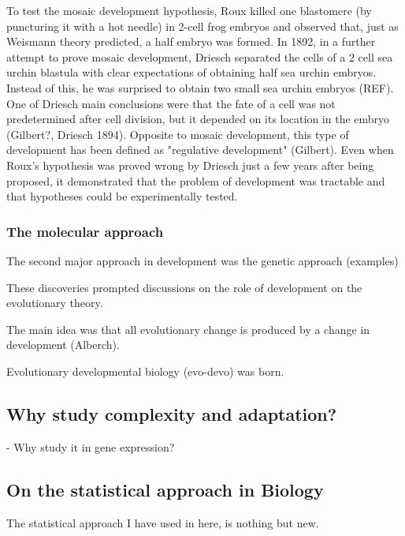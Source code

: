 To test the mosaic development hypothesis, Roux killed one blastomere (by puncturing it with a hot needle) in 2-cell frog embryos and observed that, just as Weismann theory predicted, a half embryo was formed.
In 1892, in a further attempt to prove mosaic development, Driesch separated the cells of a 2 cell sea urchin blastula with clear expectations of obtaining half sea urchin embryos. 
Instead of this, he was surprised to obtain two small sea urchin embryos (REF). One of Driesch main conclusions were that the fate of a cell was not predetermined after cell division, but it depended on its location in the embryo (Gilbert?, Driesch 1894). 
Opposite to mosaic development, this type of development has been defined as "regulative development" (Gilbert).
Even when Roux's hypothesis was proved wrong by Driesch just a few years after being proposed, it demonstrated that the problem of development was tractable and that hypotheses could be experimentally tested.

\subsubsection{The molecular approach}



The second major approach in development was the genetic approach (examples)

These discoveries prompted discussions on the role of development on the evolutionary theory.

The main idea was that all evolutionary change is produced by a change in development (Alberch).

Evolutionary developmental biology (evo-devo) was born.



\subsection{Why study complexity and adaptation?}

- Why study it in gene expression?

\subsection{On the statistical approach in Biology}
The statistical approach I have used in here, is nothing but new.

